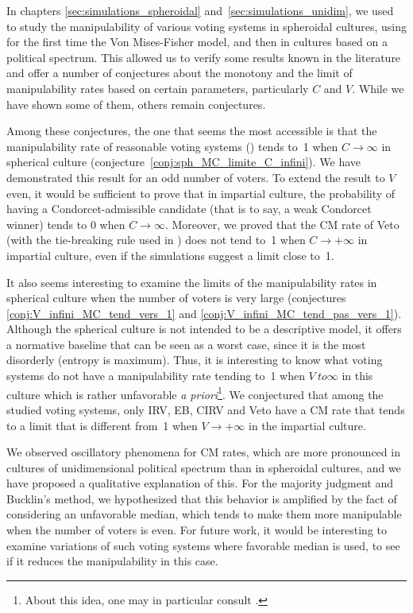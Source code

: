 \medskip
In chapters \ref{sec:simulations_spheroidal} and~\ref{sec:simulations_unidim}, we used \svvamp{} to study the manipulability of various voting systems in spheroidal cultures, using for the first time the Von Mises-Fisher model, and then in cultures based on a political spectrum. This allowed us to verify some results known in the literature and offer a number of conjectures about the monotony and the limit of manipulability rates based on certain parameters, particularly $ C $ and $ V $. While we have shown some of them, others remain conjectures.

Among these conjectures, the one that seems the most accessible is that the manipulability rate of reasonable voting systems (\cminf{}) tends to~1 when $ C \to \infty $ in spherical culture (conjecture~\ref{conj:sph_MC_limite_C_infini}). We have demonstrated this result for an odd number of voters. To extend the result to $ V $ even, it would be sufficient to prove that in impartial culture, the probability of having a Condorcet-admissible candidate (that is to say, a weak Condorcet winner) tends to 0 when $ C \to \infty $. Moreover, we proved that the CM rate of Veto (with the tie-breaking rule used in \svvamp{}) does not tend to~1 when $ C \to +\infty $ in impartial culture, even if the simulations suggest a limit close to~1.

It also seems interesting to examine the limits of the manipulability rates in spherical culture when the number of voters is very large (conjectures \ref{conj:V_infini_MC_tend_vers_1} and \ref{conj:V_infini_MC_tend_pas_vers_1}). Although the spherical culture is not intended to be a descriptive model, it offers a normative baseline that can be seen as a worst case, since it is the most disorderly (entropy is maximum). Thus, it is interesting to know what voting systems do not have a manipulability rate tending to~1 when $ V \ to \infty $ in this culture which is rather unfavorable \emph{a priori}\footnote{About this idea, one may in particular consult \cite{tsetlin2003impartialculture}.}. We conjectured that among the studied voting systems, only IRV, EB, CIRV and Veto have a CM rate that tends to a limit that is different from~1 when $ V \to +\infty $ in the impartial culture.

We observed oscillatory phenomena for CM rates, which are more pronounced in cultures of unidimensional political spectrum than in spheroidal cultures, and we have proposed a qualitative explanation of this. For the majority judgment and Bucklin's method, we hypothesized that this behavior is amplified by the fact of considering an unfavorable median, which tends to make them more manipulable when the number of voters is even. For future work, it would be interesting to examine variations of such voting systems where favorable median is used, to see if it reduces the manipulability in this case.

